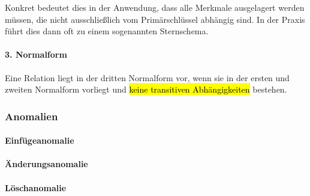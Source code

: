 Konkret bedeutet dies in der Anwendung, dass alle Merkmale ausgelagert werden müssen, die nicht ausschließlich vom Primärschlüssel abhängig sind. In der Praxis führt dies dann oft zu einem sogenannten Sternschema.



\paragraph{3. Normalform} Eine Relation liegt in der dritten Normalform vor, wenn sie in der ersten und zweiten Normalform vorliegt und \hl{keine transitiven Abhängigkeiten} bestehen.

\subsubsection{Anomalien}

\paragraph{Einfügeanomalie}

\paragraph{Änderungsanomalie}

\paragraph{Löschanomalie}